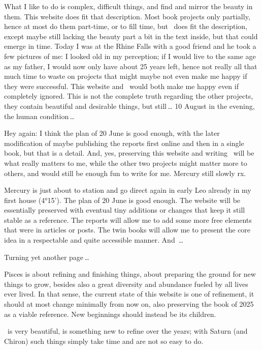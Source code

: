 \begin{itemize}
What I like to do is complex, difficult things,
and find and mirror the beauty in them.
%
This website does fit that description.
%
Most book projects only partially,
hence at most do them part-time,
or to fill time,
but \ELEMENTAL\ does fit the description,
except maybe still lacking the beauty part a bit in the text inside,
but that could emerge in time.
%
Today I was at the Rhine Falls with a good friend
and he took a few pictures of me:
I looked old in my perception;
if I would live to the same age as my father,
I would now only have about 25 years left,
hence not really all that much time to waste
on projects that might maybe not even make me happy
if they were successful.
%
{\color{odyssey}%
This website and \ELEMENTAL\ would both make me happy
even if completely ignored.}
%
This is not the complete truth regarding the other projects,
they contain beautiful and desirable things,
but still\,…
%
10 August in the evening,
{\color{odyssey}the human condition}\,…

Hey again:
I think the plan of 20 June is good enough,
with the later modification of maybe publishing the reports
first online and then in a single book,
but that is a detail.
%
And, yes,
preserving this website and writing \ELEMENTAL\
will be what really matters to me,
while the other two projects might matter more to others,
and would still be enough fun to write for me.
%
Mercury still slowly rx.

Mercury is just about to station and go direct again
in early Leo already in my first house (4°15').
%
The plan of 20 June is good enough.
%
The website will be essentially preserved
with eventual tiny additions or changes
that keep it still stable as a reference.
%
The reports will allow me
to add some more free elements
that were in articles or posts.
%
The twin books will allow me
to present the core idea
in a respectable and quite accessible manner.
%
And \ELEMENTAL\,…

Turning yet another page\,…

Pisces is about refining and finishing things,
about preparing the ground for new things to grow,
besides also a great diversity and abundance
fueled by all lives ever lived.
%
In that sense,
the current state of this website is one of refinement,
it should at most change minimally from now on,
also preserving the book of 2025 as a viable reference.
%
New beginnings should instead be its children.

\ELEMENTAL\ is very beautiful,
is something new to refine over the years;
with Saturn (and Chiron) such things
simply take time and are not so easy to do.


\end{itemize}
